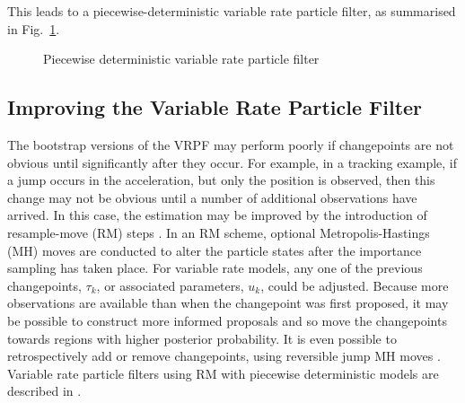 \documentclass[10pt,twocolumn,twoside]{IEEEtran}
\begin{document}
This leads to a piecewise-deterministic variable rate particle filter, as summarised in Fig.~\ref{alg:VRPF}.

\begin{figure}
\caption{Piecewise deterministic variable rate particle filter}
\label{alg:VRPF}
\end{figure}



\subsection{Improving the Variable Rate Particle Filter}

The bootstrap versions of the VRPF may perform poorly if changepoints are not obvious until significantly after they occur. For example, in a tracking example, if a jump occurs in the acceleration, but only the position is observed, then this change may not be obvious until a number of additional observations have arrived. In this case, the estimation may be improved by the introduction of resample-move (RM) steps \cite{Gilks2001}. In an RM scheme, optional Metropolis-Hastings (MH) moves are conducted to alter the particle states after the importance sampling has taken place. For variable rate models, any one of the previous changepoints, $\tau_k$, or associated parameters, $u_k$, could be adjusted. Because more observations are available than when the changepoint was first proposed, it may be possible to construct more informed proposals and so move the changepoints towards regions with higher posterior probability. It is even possible to retrospectively add or remove changepoints, using reversible jump MH moves \cite{Green1995}. Variable rate particle filters using RM with piecewise deterministic models are described in \cite{Whiteley2011,Gilholm2008}.
\end{document}
